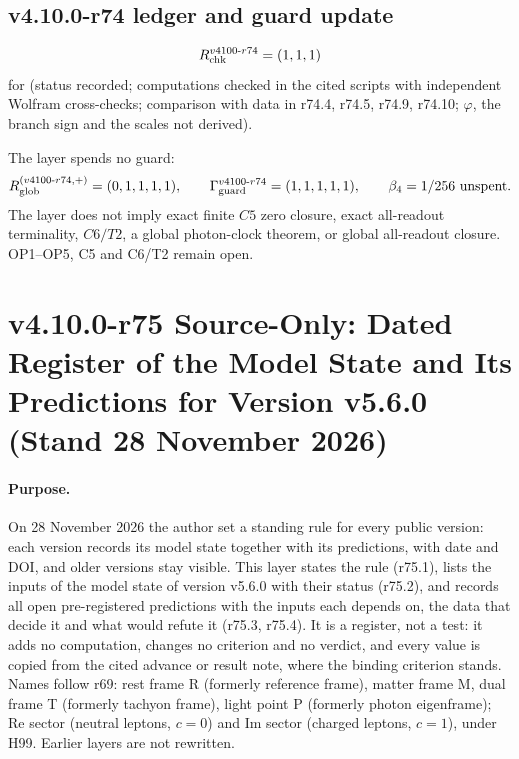 \subsection*{v4.10.0-r74 ledger and guard update}
\label{subsec:v4100-r74-ledger-guard}

\[
R_{\rm chk}^{v4100\text{-}r74}=(1,1,1)
\]
for (status recorded; computations checked in the cited scripts with independent Wolfram cross-checks; comparison with data in r74.4, r74.5,
r74.9, r74.10; \(\varphi\), the branch sign and the scales not derived).

The layer spends no guard:
\[
R_{\rm glob}^{(v4100\text{-}r74,+)}=(0,1,1,1,1),
\qquad
\Gamma_{\rm guard}^{v4100\text{-}r74}=(1,1,1,1,1),
\qquad
\beta_4=1/256\ \text{unspent}.
\]
The layer does not imply exact finite \(C5\) zero closure, exact all-readout terminality, \(C6/T2\), a global photon-clock theorem,
or global all-readout closure.  OP1--OP5, C5 and C6/T2 remain open.

\clearpage
\section*{v4.10.0-r75 Source-Only: Dated Register of the Model State and Its Predictions for Version v5.6.0 (Stand 28 November 2026)}
\label{sec:v4100-r75-prediction-register}

\paragraph{Purpose.}
On 28 November 2026 the author set a standing rule for every public version: each version records its model state together with its
predictions, with date and DOI, and older versions stay visible.  This layer states the rule (r75.1), lists the inputs of the model state of
version v5.6.0 with their status (r75.2), and records all open pre-registered predictions with the inputs each depends on, the data that decide
it and what would refute it (r75.3, r75.4).  It is a register, not a test: it adds no computation, changes no criterion and no verdict, and
every value is copied from the cited advance or result note, where the binding criterion stands.  Names follow r69: rest frame R (formerly
reference frame), matter frame M, dual frame T (formerly tachyon frame), light point P (formerly photon eigenframe); Re sector (neutral
leptons, \(c=0\)) and Im sector (charged leptons, \(c=1\)), under H99.  Earlier layers are not rewritten.

